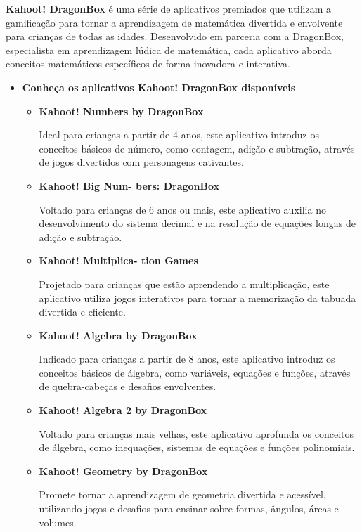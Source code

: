 \textbf{Kahoot! DragonBox} é uma série de aplicativos premiados que utilizam a gamificação para tornar a aprendizagem de matemática divertida e envolvente para crianças de todas as idades. Desenvolvido em parceria com a DragonBox, especialista em aprendizagem lúdica de matemática, cada aplicativo aborda conceitos matemáticos específicos de forma inovadora e interativa.

\begin{itemize}
\item \textbf{Conheça os aplicativos Kahoot! DragonBox disponíveis}


\begin{itemize}
    \item \textbf{Kahoot! Numbers by
DragonBox}

Ideal para crianças a partir de 4 anos, este aplicativo introduz os conceitos básicos de número, como contagem, adição e subtração, através de jogos divertidos com personagens cativantes.

    \item \textbf{Kahoot! Big Num-
bers: DragonBox}

Voltado para crianças de 6 anos ou mais, este aplicativo auxilia no desenvolvimento do sistema decimal e na resolução de equações longas de adição e subtração.

    \item \textbf{Kahoot! Multiplica-
tion Games}

Projetado para crianças que estão aprendendo a multiplicação, este aplicativo utiliza jogos interativos para tornar a memorização da tabuada divertida e eficiente.

    \item \textbf{Kahoot! Algebra by
DragonBox}

Indicado para crianças a partir de 8 anos, este aplicativo introduz os conceitos básicos de álgebra, como variáveis, equações e funções, através de quebra-cabeças e desafios envolventes.

\item \textbf{Kahoot! Algebra 2 by
DragonBox}

Voltado para crianças mais velhas, este aplicativo aprofunda os conceitos de álgebra, como inequações, sistemas de equações e funções polinomiais.

\item \textbf{Kahoot! Geometry
by DragonBox}

Promete tornar a aprendizagem de geometria divertida e acessível, utilizando jogos e desafios para ensinar sobre formas, ângulos, áreas e volumes.


\end{itemize}
\end{itemize}
